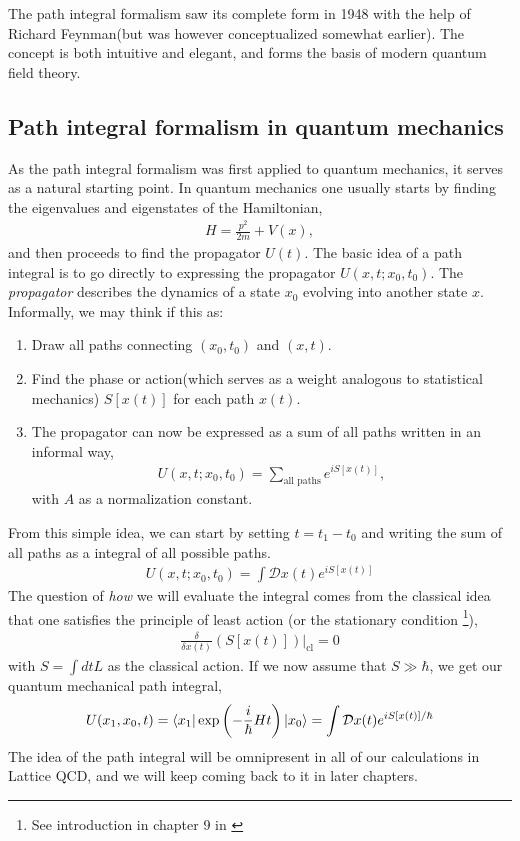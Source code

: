 The path integral formalism saw its complete form in 1948 with the help of Richard Feynman\cite{RevModPhys.20.367}(but was however conceptualized somewhat earlier). The concept is both intuitive and elegant, and forms the basis of modern quantum field theory.

\subsection{Path integral formalism in quantum mechanics}
As the path integral formalism was first applied to quantum mechanics, it serves as a natural starting point. In quantum mechanics one usually starts by finding the eigenvalues and eigenstates of the Hamiltonian,
\begin{align*}
	H = \frac{p^2}{2m} + V(x),
\end{align*}
and then proceeds to find the propagator $U(t)$. The basic idea of a path integral is to go directly to expressing the propagator $U(x,t;x_0,t_0)$. The \textit{propagator} describes the dynamics of a state $x_0$ evolving into another state $x$. Informally, we may think if this as:
\begin{enumerate}
	\item Draw all paths connecting $(x_0,t_0)$ and $(x,t)$.
	\item Find the phase or action(which serves as a weight analogous to statistical mechanics) $S[x(t)]$ for each path $x(t)$.
	\item The propagator can now be expressed as a sum of all paths written in an informal way,
	\begin{align*}
		U(x,t;x_0,t_0) = \sum_\text{all paths} e^{iS[x(t)]},
	\end{align*}
	with $A$ as a normalization constant.
\end{enumerate}
From this simple idea, we can start by setting $t = t_1 - t_0$ and writing the sum of all paths as a integral of all possible paths.
\begin{align*}
	U(x,t;x_0,t_0) = \int \mathcal{D}x(t)e^{iS[x(t)]}
\end{align*}
The question of \textit{how} we will evaluate the integral comes from the classical idea that one satisfies the principle of least action (or the stationary condition \footnote{See introduction in chapter 9 in \cite{peskin}}),
\begin{align*}
	\frac{\delta}{\delta x(t)} \left( S\left[ x(t) \right] \right) \Big|_{\text{cl}} = 0
\end{align*}
with $S = \int dt L$ as the classical action. If we now assume that $S \gg \hbar$, we get our quantum mechanical path integral,
\begin{align}
	U(x_1,x_0,t) = \langle{x_1}| \exp \left( -\frac{i}{\hbar} H t \right) |{x_0}\rangle = \int \mathcal{D}x(t)e^{iS[x(t)]/\hbar}
	\label{eq:propagator-definition-qm}
\end{align}
The idea of the path integral will be omnipresent in all of our calculations in Lattice QCD, and we will keep coming back to it in later chapters.

